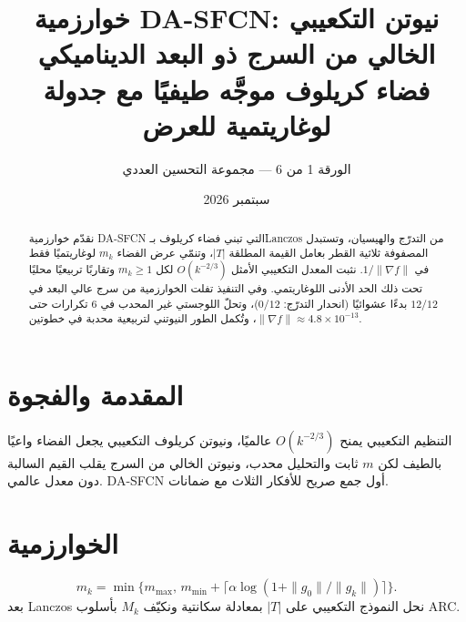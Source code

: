 ﻿\documentclass[12pt,a4paper]{article}
\title{\textbf{خوارزمية DA-SFCN: نيوتن التكعيبي الخالي من السرج ذو البعد الديناميكي}\\
\large فضاء كريلوف موجَّه طيفيًا مع جدولة لوغاريتمية للعرض}
\author{الورقة 1 من 6 --- مجموعة التحسين العددي}
\date{سبتمبر 2026}
\begin{document}
\maketitle
\begin{abstract}
نقدّم خوارزمية \textenglish{DA-SFCN} التي تبني فضاء كريلوف بـ\textenglish{Lanczos}
من التدرّج والهيسيان، وتستبدل المصفوفة ثلاثية القطر بعامل القيمة المطلقة
$|T|$، وتنمّي عرض الفضاء $m_k$ لوغاريتميًا فقط في $1/\|\nabla f\|$.
نثبت المعدل التكعيبي الأمثل $O(k^{-2/3})$ لكل $m_k\ge 1$ وتقاربًا تربيعيًا
محليًا تحت ذلك الحد الأدنى اللوغاريتمي. وفي التنفيذ تفلت الخوارزمية من سرج
عالي البعد في $12/12$ بدءًا عشوائيًا (انحدار التدرّج: $0/12$)، وتحلّ
اللوجستي غير المحدب في 6 تكرارات حتى $\|\nabla f\|\approx 4.8\times 10^{-13}$،
وتُكمل الطور النيوتني لتربيعية محدبة في خطوتين.
\end{abstract}

\section{المقدمة والفجوة}
التنظيم التكعيبي يمنح $O(k^{-2/3})$ عالميًا، ونيوتن كريلوف التكعيبي يجعل
الفضاء واعيًا بالطيف لكن $m$ ثابت والتحليل محدب، ونيوتن الخالي من السرج
يقلب القيم السالبة دون معدل عالمي. \textenglish{DA-SFCN} أول جمع صريح
للأفكار الثلاث مع ضمانات.

\section{الخوارزمية}
\begin{equation}
m_k=\min\bigl\{m_{\max},\,m_{\min}+\lceil\alpha\log(1+\|g_0\|/\|g_k\|)\rceil\bigr\}.
\end{equation}
بعد \textenglish{Lanczos} نحل النموذج التكعيبي على $|T|$ بمعادلة سكانتية
ونكيّف $M_k$ بأسلوب \textenglish{ARC}.
\end{document}
